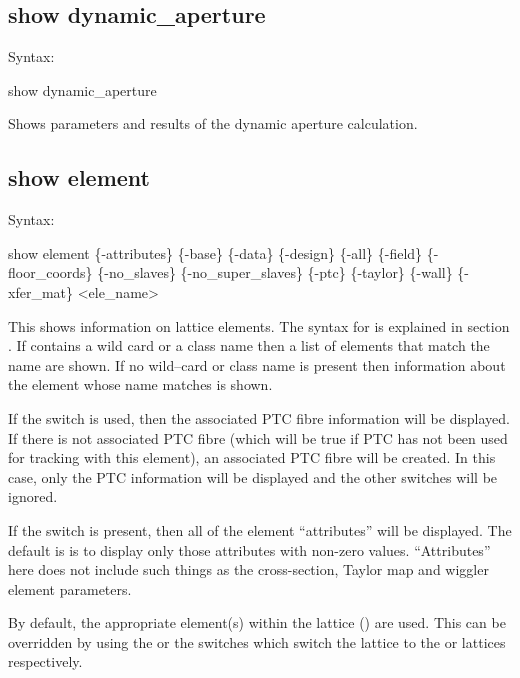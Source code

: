 {{{{{{{{\subsection{show dynamic_aperture}
\label{s:show.dynamic}

Syntax:
\begin{example}
  show dynamic_aperture
\end{example}


Shows parameters and results of the dynamic aperture calculation.


\subsection{show element}
\label{s:show.element}

Syntax:
\begin{example}
  show element \{-attributes\} \{-base\} \{-data\} \{-design\} \{-all\} \{-field\}
      \{-floor_coords\} \{-no_slaves\} \{-no_super_slaves\} \{-ptc\} \{-taylor\} \{-wall\} 
      \{-xfer_mat\} <ele_name>
\end{example}

This shows information on lattice elements. The syntax for  is explained in
section . If  contains a wild card or a class name
then a list of elements that match the name are shown. If no wild--card or class name is
present then information about the element whose name matches  is shown.

If the  switch is used, then the associated PTC fibre information will be
displayed. If there is not associated PTC fibre (which will be true if PTC has not been
used for tracking with this element), an associated PTC fibre will be created. In this
case, only the PTC information will be displayed and the other switches will be ignored.

If the  switch is present, then all of the element ``attributes'' will be
displayed. The default is is to display only those attributes with non-zero
values. ``Attributes'' here does not include such things as the cross-section, Taylor map
and wiggler element parameters.

By default, the appropriate element(s) within the  lattice ()
are used. This can be overridden by using the  or the  switches
which switch the lattice to the  or  lattices respectively.

}}}}}}}}
